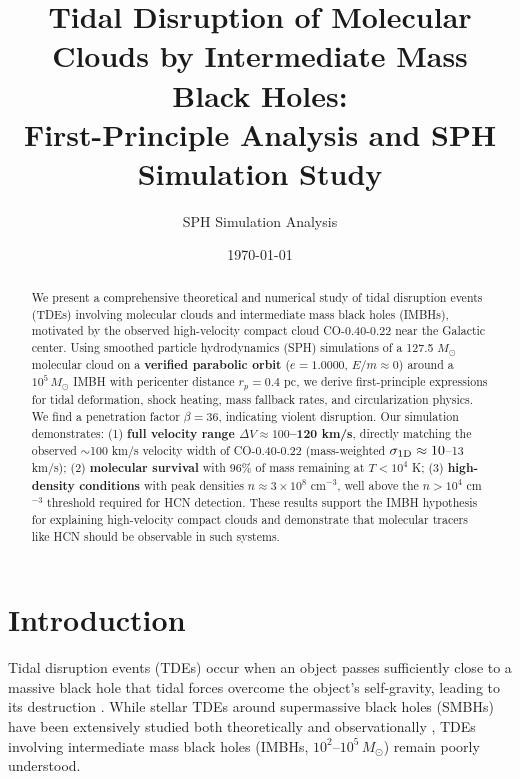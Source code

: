 \documentclass[twocolumn,amsmath,amssymb,prd,superscriptaddress,nofootinbib]{revtex4-2}
\begin{document}
\title{Tidal Disruption of Molecular Clouds by Intermediate Mass Black Holes:\\
First-Principle Analysis and SPH Simulation Study}

\author{SPH Simulation Analysis}

\date{\today}

\begin{abstract}
We present a comprehensive theoretical and numerical study of tidal disruption events (TDEs) involving molecular clouds and intermediate mass black holes (IMBHs), motivated by the observed high-velocity compact cloud CO-0.40-0.22 near the Galactic center. Using smoothed particle hydrodynamics (SPH) simulations of a 127.5 $M_\odot$ molecular cloud on a \textbf{verified parabolic orbit} ($e = 1.0000$, $E/m \approx 0$) around a $10^5\,M_\odot$ IMBH with pericenter distance $r_p = 0.4$ pc, we derive first-principle expressions for tidal deformation, shock heating, mass fallback rates, and circularization physics. We find a penetration factor $\beta = 36$, indicating violent disruption. Our simulation demonstrates: (1) \textbf{full velocity range $\Delta V \approx 100$--120 km/s}, directly matching the observed $\sim$100 km/s velocity width of CO-0.40-0.22 (mass-weighted $\sigma_{\rm 1D} \approx 10$--13 km/s); (2) \textbf{molecular survival} with 96\% of mass remaining at $T < 10^4$ K; (3) \textbf{high-density conditions} with peak densities $n \approx 3 \times 10^8$ cm$^{-3}$, well above the $n > 10^4$ cm$^{-3}$ threshold required for HCN detection. These results support the IMBH hypothesis for explaining high-velocity compact clouds and demonstrate that molecular tracers like HCN should be observable in such systems.
\end{abstract}

\maketitle

\section{Introduction}
\label{sec:intro}

Tidal disruption events (TDEs) occur when an object passes sufficiently close to a massive black hole that tidal forces overcome the object's self-gravity, leading to its destruction \cite{Rees1988,Hills1975}. While stellar TDEs around supermassive black holes (SMBHs) have been extensively studied both theoretically and observationally \cite{Gezari2021}, TDEs involving intermediate mass black holes (IMBHs, $10^2$--$10^5\,M_\odot$) remain poorly understood.
\end{document}
